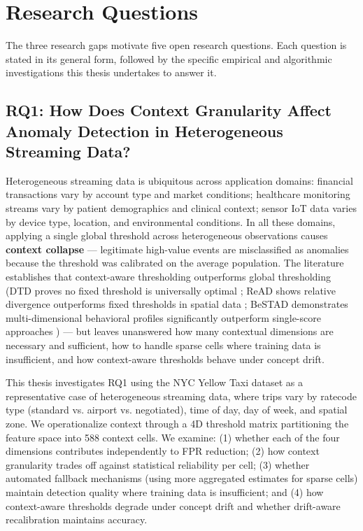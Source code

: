 \section{Research Questions}

The three research gaps motivate five open research questions. Each question is stated in its general form, followed by the specific empirical and algorithmic investigations this thesis undertakes to answer it.

\subsection{RQ1: How Does Context Granularity Affect Anomaly Detection in Heterogeneous Streaming Data?}

Heterogeneous streaming data is ubiquitous across application domains: financial transactions vary by account type and market conditions; healthcare monitoring streams vary by patient demographics and clinical context; sensor IoT data varies by device type, location, and environmental conditions. In all these domains, applying a single global threshold across heterogeneous observations causes \textbf{context collapse} --- legitimate high-value events are misclassified as anomalies because the threshold was calibrated on the average population. The literature establishes that context-aware thresholding outperforms global thresholding (DTD proves no fixed threshold is universally optimal \citep{dtd2026}; ReAD shows relative divergence outperforms fixed thresholds in spatial data \citep{read2020}; BeSTAD demonstrates multi-dimensional behavioral profiles significantly outperform single-score approaches \citep{bestad2025}) --- but leaves unanswered how many contextual dimensions are necessary and sufficient, how to handle sparse cells where training data is insufficient, and how context-aware thresholds behave under concept drift.

This thesis investigates RQ1 using the NYC Yellow Taxi dataset as a representative case of heterogeneous streaming data, where trips vary by ratecode type (standard vs. airport vs. negotiated), time of day, day of week, and spatial zone. We operationalize context through a 4D threshold matrix partitioning the feature space into 588 context cells. We examine: (1) whether each of the four dimensions contributes independently to FPR reduction; (2) how context granularity trades off against statistical reliability per cell; (3) whether automated fallback mechanisms (using more aggregated estimates for sparse cells) maintain detection quality where training data is insufficient; and (4) how context-aware thresholds degrade under concept drift and whether drift-aware recalibration maintains accuracy.


